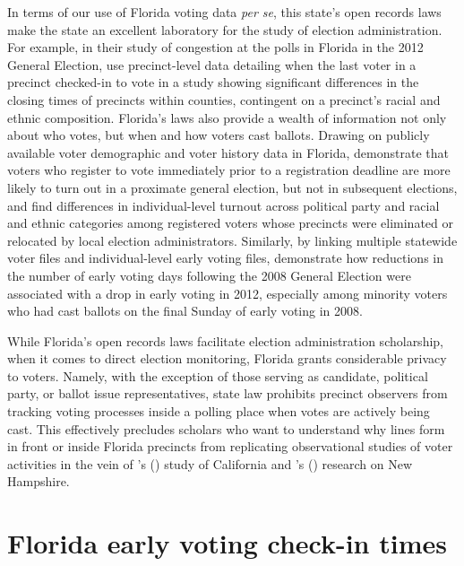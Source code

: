 \documentclass[12pt,titlepage]{article}
\newcommand{\possessivecite}[1]{\citeauthor{#1}'s (\citeyear{#1})}
\begin{document}
In terms of our use of Florida voting data \emph{per se}, this state's
open records laws make the state an excellent laboratory for the study
of election administration. For example, in their study of congestion
at the polls in Florida in the 2012 General Election,
\cite{herronsmith:closingtimes} use precinct-level data detailing when
the last voter in a precinct checked-in to vote in a study showing
significant differences in the closing times of precincts within
counties, contingent on a precinct's racial and ethnic
composition. Florida's laws also provide a wealth of information not
only about who votes, but when and how voters cast ballots.  Drawing
on publicly available voter demographic and voter history data in
Florida, \cite{shinosmith:registrationtiming} demonstrate that voters
who register to vote immediately prior to a registration deadline are
more likely to turn out in a proximate general election, but not in
subsequent elections, and \cite{amos_etal2017} find differences in
individual-level turnout across political party and racial and ethnic
categories among registered voters whose precincts were eliminated or
relocated by local election administrators.  Similarly, by linking
multiple statewide voter files and individual-level early voting
files, \cite{herron_smith2014} demonstrate how reductions in the
number of early voting days following the 2008 General Election were
associated with a drop in early voting in 2012, especially among
minority voters who had cast ballots on the final Sunday of early
voting in 2008.


While Florida's open records laws facilitate election administration
scholarship, when it comes to direct election monitoring, Florida
grants considerable privacy to voters.  Namely, with the exception of
those serving as candidate, political party, or ballot issue
representatives, state law prohibits precinct observers from tracking
voting processes inside a polling place when votes are actively being
cast. This effectively precludes scholars who want to understand why
lines form in front or inside Florida precincts from replicating
observational studies of voter activities in the vein of
\possessivecite{spencermarkovits:renege} study of California and
\possessivecite{herronsmith:hanoverstudy} research on New Hampshire.

\section*{Florida early voting check-in times}
\end{document}
